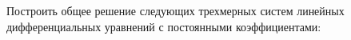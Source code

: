 	Построить общее решение следующих трехмерных систем линейных дифференциальных уравнений с постоянными коэффициентами:
	\begin{multicols}{3}
		\begin{enumtasks}
			

\end{enumtasks}
\end{multicols}
